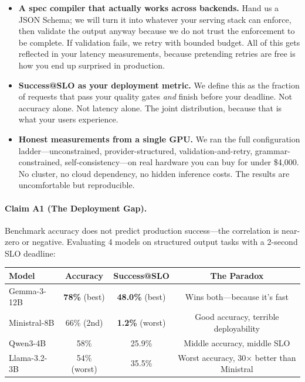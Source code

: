 \documentclass[11pt]{article}
\begin{document}
\begin{itemize}[leftmargin=12pt]
    \item \textbf{A spec compiler that actually works across backends.}
    Hand us a JSON Schema; we will turn it into whatever your serving stack can enforce, then validate the output anyway because we do not trust the enforcement to be complete.
    If validation fails, we retry with bounded budget.
    All of this gets reflected in your latency measurements, because pretending retries are free is how you end up surprised in production.

    \item \textbf{Success@SLO as your deployment metric.}
    We define this as the fraction of requests that pass your quality gates \emph{and} finish before your deadline.
    Not accuracy alone.
    Not latency alone.
    The joint distribution, because that is what your users experience.

    \item \textbf{Honest measurements from a single GPU.}
    We ran the full configuration ladder---unconstrained, provider-structured, validation-and-retry, grammar-constrained, self-consistency---on real hardware you can buy for under \$4{,}000.
    No cluster, no cloud dependency, no hidden inference costs.
    The results are uncomfortable but reproducible.
\end{itemize}


\paragraph{Claim A1 (The Deployment Gap).}
Benchmark accuracy does not predict production success---the correlation is near-zero or negative.
Evaluating 4 models on structured output tasks with a 2-second SLO deadline:

\begin{center}
\begin{tabular}{lccc}
\toprule
\textbf{Model} & \textbf{Accuracy} & \textbf{Success@SLO} & \textbf{The Paradox} \\
\midrule
Gemma-3-12B & \textbf{78\%} (best) & \textbf{48.0\%} (best) & Wins both---because it's fast \\
Ministral-8B & 66\% (2nd) & \textbf{1.2\%} (worst) & Good accuracy, terrible deployability \\
Qwen3-4B & 58\% & 25.9\% & Middle accuracy, middle SLO \\
Llama-3.2-3B & 54\% (worst) & 35.5\% & Worst accuracy, 30$\times$ better than Ministral \\
\bottomrule
\end{tabular}
\end{center}
\end{document}
